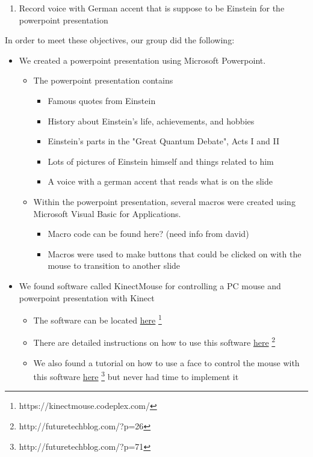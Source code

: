 \documentclass[12pt]{article}
\begin{document}
\begin{description}
\begin{enumerate}
			\item Record voice with German accent that is suppose to be Einstein for the powerpoint presentation
		\end{enumerate}
		In order to meet these objectives, our group did the following:
		\begin{itemize}
			\item We created a powerpoint presentation using Microsoft Powerpoint.
				\begin{itemize}
					\item The powerpoint presentation contains
						\begin{itemize}
							\item Famous quotes from Einstein
							\item History about Einstein's life, achievements, and hobbies
							\item Einstein's parts in the "Great Quantum Debate", Acts I and II
							\item Lots of pictures of Einstein himself and things related to him
							\item A voice with a german accent that reads what is on the slide
						\end{itemize}
					\item Within the powerpoint presentation, several macros were created using Microsoft Visual Basic for Applications.
						\begin{itemize}
							\item Macro code can be found here? (need info from david)
							\item Macros were used to make buttons that could be clicked on with the mouse to transition to another slide
						\end{itemize}
				\end{itemize}
			\newpage
			\item We found software called KinectMouse for controlling a PC mouse and powerpoint presentation with Kinect
				\begin{itemize}
					\item The software can be located \href{https://kinectmouse.codeplex.com/}{here} \footnote{https://kinectmouse.codeplex.com/}
					\item There are detailed instructions on how to use this software \href{http://futuretechblog.com/?p=26}{here} \footnote{http://futuretechblog.com/?p=26}
					\item We also found a tutorial on how to use a face to control the mouse with this software \href{http://futuretechblog.com/?p=71}{here} \footnote{http://futuretechblog.com/?p=71} but never had time to implement it

\end{itemize}
\end{itemize}
\end{description}
\end{document}
